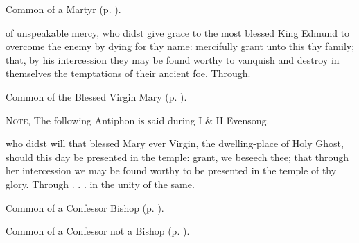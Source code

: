 \begin{rubric}
	Common of a Martyr (p. \pageref{CommonMartyr}).
\end{rubric}

{} of unspeakable mercy, who didst give grace to the most blessed King Edmund to overcome the enemy by dying for thy name: mercifully grant unto this thy family; that, by his intercession they may be found worthy to vanquish and destroy in themselves the temptations of their ancient foe. Through.



\begin{rubric}
	Common of the Blessed Virgin Mary (p. \pageref{CommonBVM}).
\end{rubric}

\begin{rubric}
	\textsc{Note,} The following Antiphon is said during I \& II Evensong.
\end{rubric}


\collect
{} who didst will that blessed Mary ever Virgin, the dwelling-place of Holy Ghost, should this day be presented in the temple: grant, we beseech thee; that through her intercession we may be found worthy to be presented in the temple of thy glory. Through . . . in the unity of the same.



\begin{rubric}
	Common of a Confessor Bishop (p. \pageref{ConfessorBishopCollect}).
\end{rubric}



\begin{rubric}
	Common of a Confessor not a Bishop (p. \pageref{ConfessorNotBishopCollect}).
\end{rubric}


\clearpage
{}

